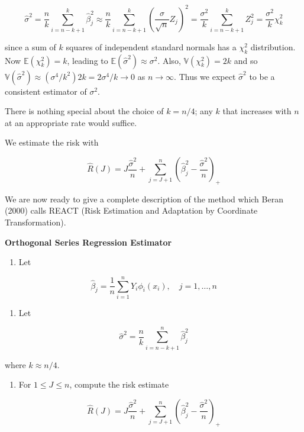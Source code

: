 \[ \hat{\sigma}^2 = \frac{n}{k} \sum_{i=n-k+1}^k \hat{\beta}_j^2 \approx \frac{n}{k} \sum_{i=n-k+1}^k \left( \frac{\sigma}{\sqrt{n}} Z_j \right)^2 = \frac{\sigma^2}{k} \sum_{i=n-k+1}^k Z_j^2 = \frac{\sigma^2}{k} \chi_k^2\]

since a sum of \(k\) squares of independent standard normals has a
\(\chi_k^2\) distribution. Now \(\mathbb{E}(\chi_k^2) = k\), leading to
\(\mathbb{E}(\hat{\sigma}^2) \approx \sigma^2\). Also,
\(\mathbb{V}(\chi_k^2) = 2k\) and so
\(\mathbb{V}(\hat{\sigma}^2) \approx (\sigma^4 / k^2) 2k = 2\sigma^4 / k \rightarrow 0\)
as \(n \rightarrow \infty\). Thus we expect \(\hat{\sigma}^2\) to be a
consistent estimator of \(\sigma^2\).

There is nothing special about the choice of \(k = n / 4\); any \(k\)
that increases with \(n\) at an appropriate rate would suffice.

We estimate the risk with

\[ \hat{R}(J) = J \frac{\hat{\sigma}^2}{n} + \sum_{j=J+1}^n \left(\hat{\beta}_j^2 - \frac{\hat{\sigma}^2}{n} \right)_{+} \]

We are now ready to give a complete description of the method which
Beran (2000) calls REACT (Risk Estimation and Adaptation by Coordinate
Transformation).

\textbf{Orthogonal Series Regression Estimator}

\begin{enumerate}[tightlist,label={\arabic*.}]
\item
  Let
\end{enumerate}

\[ \hat{\beta}_j = \frac{1}{n} \sum_{i=1}^n Y_i \phi_i(x_i), \quad j = 1, \dots, n\]

\begin{enumerate}[tightlist,label={\arabic*.}]
\item
  Let
\end{enumerate}

\[ \hat{\sigma}^2 = \frac{n}{k} \sum_{i=n-k+1}^n \hat{\beta}_j^2 \]

where \(k \approx n / 4\).

\begin{enumerate}[tightlist,label={\arabic*.},resume]
\item
  For \(1 \leq J \leq n\), compute the risk estimate
\end{enumerate}

\[ \hat{R}(J) = J \frac{\hat{\sigma}^2}{n} + \sum_{j=J+1}^n \left(\hat{\beta}_j^2 - \frac{\hat{\sigma}^2}{n} \right)_{+} \]

